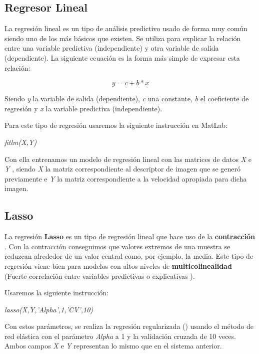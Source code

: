 \subsection{Regresor Lineal}

La regresión lineal \cite{linear} es un tipo de análisis predictivo usado de forma muy común siendo uno de los más básicos que existen. Se utiliza para explicar la relación entre una variable predictiva (independiente) y otra variable de salida (dependiente). La siguiente ecuación es la forma más simple de expresar esta relación:

\begin{equation}
y = c + b*x
\end{equation}

Siendo \textit{y} la variable de salida (dependiente), \textit{c} una constante, \textit{b} el coeficiente de regresión y \textit{x} la variable predictiva (independiente).

Para este tipo de regresión usaremos la siguiente instrucción en MatLab:

\begin{center}
\textit{fitlm(X,Y)}
\end{center}

Con ella entrenamos un modelo de regresión lineal con las matrices de datos \textit{X} e \textit{Y} \cite{fitlm}, siendo \textit{X} la matriz correspondiente al descriptor de imagen que se generó previamente e \textit{Y} la matriz correspondiente a la velocidad apropiada para dicha imagen.

\subsection{Lasso}

La regresión \textbf{Lasso} \cite{lasso} es un tipo de regresión lineal que hace uso de la \textbf{contracción} \cite{shrinkage}. Con la contracción conseguimos que valores extremos de una muestra se reduzcan alrededor de un valor central como, por ejemplo, la media. Este tipo de regresión viene bien para modelos con altos niveles de \textbf{multicolinealidad} (Fuerte correlación entre variables predictivas o explicativas \cite{multicollinearity}).

Usaremos la siguiente instrucción:

\begin{center}
\textit{lasso(X,Y,'Alpha',1,'CV',10)}
\end{center}

Con estos parámetros, se realiza la regresión regularizada (\cite{lasso-matlab}) usando el método de red elástica \cite{elasticnet} con el parámetro \textit{Alpha} a 1 y la validación cruzada \cite{cv} de 10 veces. Ambos campos \textit{X} e \textit{Y} representan lo mismo que en el sistema anterior.

